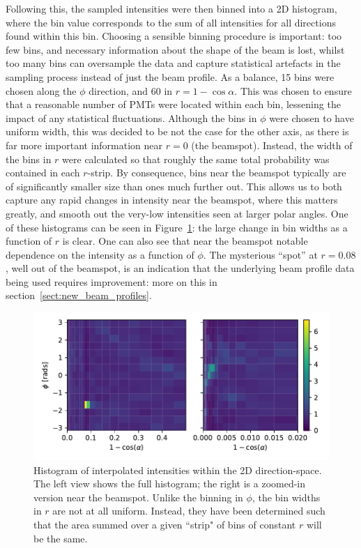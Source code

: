 Following this, the sampled intensities were then binned into a 2D histogram, where the bin value corresponds to the sum of all intensities for all directions found within this bin. Choosing a sensible binning procedure is important: too few bins, and necessary information about the shape of the beam is lost, whilst too many bins can oversample the data and capture statistical artefacts in the sampling process instead of just the beam profile. As a balance, 15 bins were chosen along the $\phi$ direction, and 60 in $r=1-\cos\alpha$. This was chosen to ensure that a reasonable number of PMTs were located within each bin, lessening the impact of any statistical fluctuations. Although the bins in $\phi$ were chosen to have uniform width, this was decided to be not the case for the other axis, as there is far more important information near $r = 0$ (the beamspot). Instead, the width of the bins in $r$ were calculated so that roughly the same total probability was contained in each $r$-strip. By consequence, bins near the beamspot typically are of significantly smaller size than ones much further out. This allows us to both capture any rapid changes in intensity near the beamspot, where this matters greatly, and smooth out the very-low intensities seen at larger polar angles. One of these histograms can be seen in Figure~\ref{fig:hist_cdf_old_profile}: the large change in bin widths as a function of $r$ is clear. One can also see that near the beamspot notable dependence on the intensity as a function of $\phi$. The mysterious ``spot'' at $r = 0.08$, well out of the beamspot, is an indication that the underlying beam profile data being used requires improvement: more on this in section~\ref{sect:new_beam_profiles}.

\begin{figure}
    \centering
    \includegraphics[width=\linewidth]{4_SMELLIESimulation/images/FS055_60_alpha_15_phi_hist.pdf}
    \caption[Histogram of interpolated intensities within the 2D direction-space]{Histogram of interpolated intensities within the 2D direction-space. The left view shows the full histogram; the right is a zoomed-in version near the beamspot. Unlike the binning in $\phi$, the bin widths in $r$ are not at all uniform. Instead, they have been determined such that the area summed over a given ``strip" of bins of constant $r$ will be the same.}
    \label{fig:hist_cdf_old_profile}
\end{figure}

